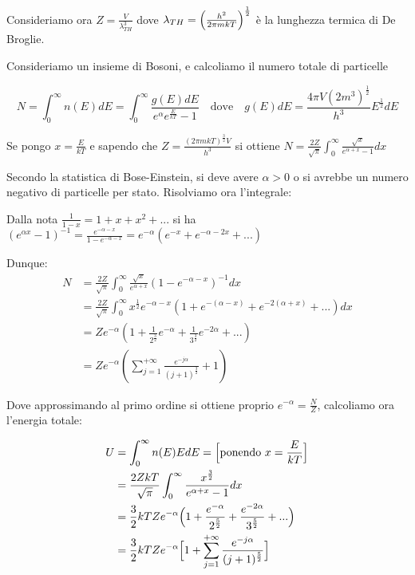 Consideriamo ora $Z = \frac{V}{\lambda_{TH}^3}$ dove $\lambda_{TH} = \Bigl(  \frac{h^2}{2 \pi m k T}  \Bigr)^{\frac{1}{2}}$ è la lunghezza termica di De Broglie.

Consideriamo un insieme di Bosoni, e calcoliamo il numero totale di particelle

\begin{equation}
N = \int_0^{\infty} n(E) dE = \int_0^{\infty} \frac{g(E) dE}{e^{\alpha} e^{\frac{E}{kT}} - 1 } 
\quad \mbox{dove} \quad 
g(E) dE = \frac{4 \pi V (2m^3)^{\frac{1}{2}}}{h^3} E^{\frac{1}{2}} dE
\end{equation}

Se pongo $x = \frac{E}{kT}$ e sapendo che $Z = \frac{(2 \pi m k T)^{\frac{3}{2}} V}{h^3}$ si ottiene $N = \frac{2 Z}{\sqrt{\pi}} \int_0^{\infty} \frac{\sqrt{x}}{e^{\alpha + x} - 1} dx$

Secondo la statistica di Bose-Einstein, si deve avere $\alpha > 0$ o si avrebbe un numero negativo di particelle per stato. 
Risolviamo ora l'integrale:

Dalla nota $\frac{1}{1 - x} = 1 + x + x^2 + ...$ si ha $(e^{\alpha x} - 1)^{-1} = \frac{e^{-\alpha - x}}{1 - e^{- \alpha - x} } = e^{- \alpha} (e^{-x} + e^{-\alpha - 2x} + ...)$

Dunque:
\begin{equation}
\begin{split}
N & = \frac{2 Z}{\sqrt{\pi}} \int_0^{\infty} \frac{\sqrt{x}}{e^{\alpha + x}} (1 - e^{-\alpha -x})^{-1} dx \\
& = \frac{2 Z}{\sqrt{\pi}} \int_0^{\infty} x^{\frac{1}{2}} e^{- \alpha -x } ( 1 + e^{-(\alpha - x)} + e^{- 2(\alpha + x)} + ...) dx \\
& = Z e^{-\alpha} (1 + \frac{1}{2^{\frac{3}{2}}} e^{- \alpha} + \frac{1}{3^{\frac{3}{2}}} e^{-2\alpha} + ... ) \\
& = Z e^{- \alpha} ( \sum_{j=1}^{+\infty} \frac{e^{- j \alpha}}{ (j + 1)^\frac{3}{2}} + 1) 
\end{split}
\end{equation}

Dove approssimando al primo ordine si ottiene proprio $ e^{ -\alpha } = \frac{ N }{ Z } $, calcoliamo ora l'energia totale:

\begin{equation}
\begin{split}
U & = \int_0^{\infty} n(E) E dE = \Bigl[  \mbox{ponendo } x = \frac{E}{kT}  \Bigr] \\
& = \frac{ 2 Z k T}{\sqrt{\pi} } \int_0^{\infty} \frac{ x^{ \frac{ 3}{2 } }}{e^{ \alpha + x } - 1 } dx \\
& = \frac{ 3}{2 } k T Z e^{ -\alpha } \Bigl(  1 + \frac{ e^{ -\alpha }}{2^{ \frac{ 5}{2 } } } + \frac{ e^{ - 2 \alpha }}{3^{ \frac{ 5}{2 } } }  + ... \Bigr) \\
& = \frac{ 3}{2 } k T Z e^{ -\alpha } \Bigl[ 1 + \sum_{j=1}^{ +\infty } \frac{ e^{ -j \alpha }}{(j + 1)^{ \frac{ 5}{2 } } } \Bigr]
\end{split}
\end{equation}


